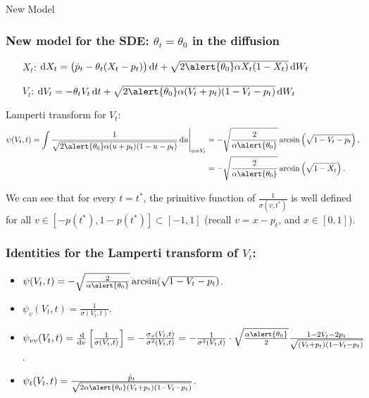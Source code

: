 \documentclass[aspectratio=169]{beamer}\usepackage[utf8]{inputenc}
\begin{document}
\begin{frame}

{\Huge New Model}

\end{frame}


\begin{frame}\frametitle{New model for the SDE: $\theta_t=\theta_0$ in the diffusion}

\begin{enumerate}

\item[$X_t$:] $\dif X_t=\left(\dot p_t-\theta_t(X_t-p_t)\right)\dif t+\sqrt{2\alert{\theta_0}\alpha X_t(1-X_t)}\dif W_t$
\item[$V_t$:] $\dif V_t=-\theta_tV_t\dif t+\sqrt{2\alert{\theta_0}\alpha(V_t+p_t)(1-V_t-p_t)}\dif W_t$

\end{enumerate}
Lamperti transform for $V_t$:
\begin{equation*}
\begin{split}
\psi(V_t,t)=\int\frac{1}{\sqrt{2\alert{\theta_0}\alpha(u+p_t)(1-u-p_t)}}\dif u\Bigg|_{u=V_t}&=-\sqrt{\frac{2}{\alpha\alert{\theta_0}}}\arcsin\left(\sqrt{1-V_t-p_t}\right),\\
&=-\sqrt{\frac{2}{\alpha\alert{\theta_0}}}\arcsin\left(\sqrt{1-X_t}\right).
\end{split}
\end{equation*}

We can see that for every $t=t^*$, the primitive function of $\frac{1}{\sigma(v,t^*)}$ is well defined for all $v\in\left[-p(t^*),1-p(t^*)\right]\subset[-1,1]$ (recall $v=x-p_t$, and $x\in[0,1]$).

\end{frame}


\begin{frame}\frametitle{Identities for the Lamperti transform of $V_t$:}

\begin{itemize}
\item $\psi(V_t,t)=-\sqrt{\frac{2}{\alpha\alert{\theta_0}}}\arcsin(\sqrt{1-V_t-p_t})$.
\item $\psi_v(V_t,t)=\frac{1}{\sigma(V_t,t)}$.
\item $\psi_{vv}(V_t,t)=\frac{\dif}{\dif v}\left[\frac{1}{\sigma(V_t,t)}\right]=-\frac{\sigma_v(V_t,t)}{\sigma^2(V_t,t)}=-\frac{1}{\sigma^2(V_t,t)}\cdot\sqrt{\frac{\alpha\alert{\theta_0}}{2}}\frac{1-2V_t-2p_t}{\sqrt{(V_t+p_t)(1-V_t-p_t)}}$.
\item $\psi_t(V_t,t)=\frac{\dot{p}_t}{\sqrt{2\alpha\alert{\theta_0}(V_t+p_t)(1-V_t-p_t)}}$.
\end{itemize}

\end{frame}
\end{document}
